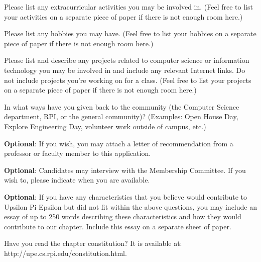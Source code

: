 \documentclass{article}
\begin{document}
\vspace*{0.5in}

Please list any extracurricular activities you may be involved in.
(Feel free to list your activities on a separate piece of paper if there is not enough room here.)

\vspace*{2.5in}

Please list any hobbies you may have.
(Feel free to list your hobbies on a separate piece of paper if there is not enough room here.)

\newpage \vspace*{0.1in}

Please list and describe any projects related to computer science or information technology you may be involved in and include any relevant Internet links.
Do not include projects you're working on for a class.
(Feel free to list your projects on a separate piece of paper if there is not enough room here.)

\vspace*{3in}

In what ways have you given back to the community (the Computer Science department, RPI, or the general community)? 
(Examples: Open House Day, Explore Engineering Day, volunteer work outside of campus, etc.)


\newpage \vspace*{0.1in}

\textbf{Optional}: If you wish, you may attach a letter of recommendation from a professor or faculty member to this application.

\vspace*{0.3in}

\textbf{Optional}: Candidates may interview with the Membership Committee. If you wish to, please indicate when you are available.

\vspace*{0.6in}

\textbf{Optional}: If you have any characteristics that you believe would contribute to Upsilon Pi Epsilon but did not fit within the above questions, you may include an essay of up to 250 words describing these characteristics and how they would contribute to our chapter. 
Include this essay on a separate sheet of paper.

\vspace*{0.3in}

Have you read the chapter constitution?
It is available at: http://upe.cs.rpi.edu/constitution.html.
\end{document}
